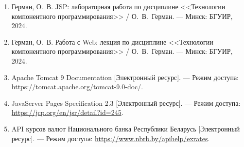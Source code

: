 \documentclass[14pt,a4paper]{extarticle}
\begin{document}
\begin{enumerate}
\item Герман, О.~В. JSP: лабораторная работа по дисциплине <<Технологии компонентного
программирования>> / О.~В.~Герман. --- Минск: БГУИР, 2024.
\item Герман, О.~В. Работа с Web: лекция по дисциплине <<Технологии компонентного
программирования>> / О.~В.~Герман. --- Минск: БГУИР, 2024.
\item Apache Tomcat 9 Documentation [Электронный ресурс]. --- Режим доступа:
\url{https://tomcat.apache.org/tomcat-9.0-doc/}.
\item JavaServer Pages Specification 2.3 [Электронный ресурс]. --- Режим доступа:
\url{https://jcp.org/en/jsr/detail?id=245}.
\item API курсов валют Национального банка Республики Беларусь [Электронный ресурс]. ---
Режим доступа: \url{https://www.nbrb.by/apihelp/exrates}.
\end{enumerate}
\end{document}
